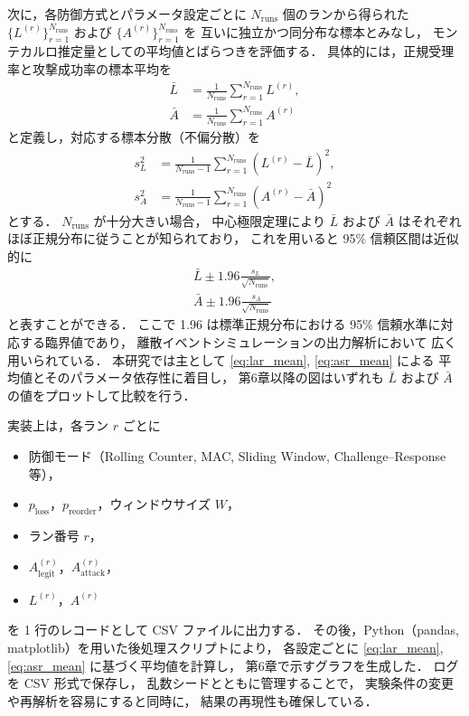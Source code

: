\documentclass[twocolumn,10pt,a4paper]{jsarticle}
\begin{document}
次に，各防御方式とパラメータ設定ごとに
$N_{\mathrm{runs}}$ 個のランから得られた
$\{L^{(r)}\}_{r=1}^{N_{\mathrm{runs}}}$ および
$\{A^{(r)}\}_{r=1}^{N_{\mathrm{runs}}}$ を
互いに独立かつ同分布な標本とみなし，
モンテカルロ推定量としての平均値とばらつきを評価する．
具体的には，正規受理率と攻撃成功率の標本平均を
\begin{align}
  \bar{L} &= \frac{1}{N_{\mathrm{runs}}} \sum_{r=1}^{N_{\mathrm{runs}}} L^{(r)}, \label{eq:lar_mean} \\
  \bar{A} &= \frac{1}{N_{\mathrm{runs}}} \sum_{r=1}^{N_{\mathrm{runs}}} A^{(r)} \label{eq:asr_mean}
\end{align}
と定義し，対応する標本分散（不偏分散）を
\begin{align}
  s_L^2 &= \frac{1}{N_{\mathrm{runs}} - 1}
          \sum_{r=1}^{N_{\mathrm{runs}}} \left( L^{(r)} - \bar{L} \right)^2, \\
  s_A^2 &= \frac{1}{N_{\mathrm{runs}} - 1}
          \sum_{r=1}^{N_{\mathrm{runs}}} \left( A^{(r)} - \bar{A} \right)^2
\end{align}
とする．
$N_{\mathrm{runs}}$ が十分大きい場合，
中心極限定理により
$\bar{L}$ および $\bar{A}$ はそれぞれ
ほぼ正規分布に従うことが知られており\cite{Law2015Simulation}，
これを用いると 95\% 信頼区間は近似的に
\begin{align}
  \bar{L} \pm 1.96 \frac{s_L}{\sqrt{N_{\mathrm{runs}}}}, \\
  \bar{A} \pm 1.96 \frac{s_A}{\sqrt{N_{\mathrm{runs}}}}
\end{align}
と表すことができる．
ここで 1.96 は標準正規分布における
95\% 信頼水準に対応する臨界値であり，
離散イベントシミュレーションの出力解析において
広く用いられている\cite{Law2015Simulation}．
本研究では主として
\eqref{eq:lar_mean}, \eqref{eq:asr_mean} による
平均値とそのパラメータ依存性に着目し，
第6章以降の図はいずれも
$\bar{L}$ および $\bar{A}$ の値をプロットして比較を行う．

実装上は，各ラン $r$ ごとに
\begin{itemize}
  \item 防御モード（Rolling Counter, MAC, Sliding Window, Challenge--Response 等），
  \item $p_{\mathrm{loss}}$，$p_{\mathrm{reorder}}$，ウィンドウサイズ $W$，
  \item ラン番号 $r$，
  \item $A^{(r)}_{\mathrm{legit}}$，$A^{(r)}_{\mathrm{attack}}$，
  \item $L^{(r)}$，$A^{(r)}$
\end{itemize}
を 1 行のレコードとして CSV ファイルに出力する．
その後，Python（pandas, matplotlib）を用いた後処理スクリプトにより，
各設定ごとに \eqref{eq:lar_mean}, \eqref{eq:asr_mean} に基づく平均値を計算し，
第6章で示すグラフを生成した．
ログを CSV 形式で保存し，
乱数シードとともに管理することで，
実験条件の変更や再解析を容易にすると同時に，
結果の再現性も確保している．
\end{document}
